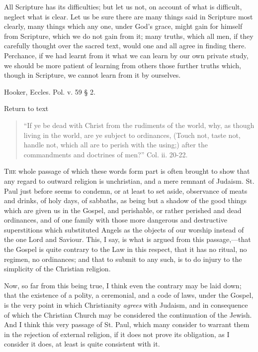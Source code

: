 All Scripture has its difficulties; but let us not, on account of
what is difficult, neglect what is clear. Let us be sure there are
many things said in Scripture most clearly, many things which any one,
under God's grace, might gain for himself from Scripture, which we do
not gain from it; many truths, which all men, if they carefully
thought over the sacred text, would one and all agree in finding
there. Perchance, if we had learnt from it what we can learn by our
own private study, we should be more patient of learning from others
those further truths which, though in Scripture, we cannot learn from
it by ourselves.


Hooker, Eccles. Pol. v. 59 § 2.

Return to text


\begin{quote}

``If ye be dead with Christ from the rudiments of the world,
why, as though living in the world, are ye subject to ordinances,
(Touch not, taste not, handle not, which all are to perish with the
using;) after the commandments and doctrines of men?'' Col. ii.
20-22.

\end{quote}

T\textsc{he} whole passage of which these words form part is often brought
to show that any regard to outward religion is unchristian, and a mere
remnant of Judaism. St. Paul just before seems to condemn, or at least
to set aside, observance of meats and drinks, of holy days, of
sabbaths, as being but a shadow of the good things which are given us
in the Gospel, and perishable, or rather perished and dead ordinances,
and of one family with those more dangerous and destructive
superstitions which substituted Angels as the objects of our worship
instead of the one Lord and Saviour. This, I say, is what is argued
from this passage,—that the Gospel is quite contrary to the Law in
this respect, that it has no ritual, no regimen, no ordinances; and
that to submit to any such, is to do injury to the simplicity of the
Christian religion.

Now, so far from this being true, I think even the contrary may be
laid down; that the existence of a polity, a ceremonial, and a code of
laws, under the Gospel, is the very point in which Christianity \emph{agrees}
with Judaism, and in consequence of which the Christian Church may be
considered the continuation of the Jewish. And I think this very
passage of St. Paul, which many consider to warrant them in the
rejection of external religion, if it does not prove its obligation,
as I consider it does, at least is quite consistent with it.

